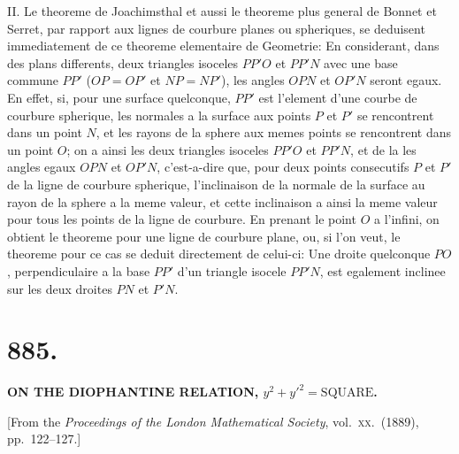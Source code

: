 \documentclass[11pt,a4paper]{book}
\begin{document}
\textsc{II.} Le theoreme de Joachimsthal et aussi le theoreme plus general de Bonnet et Serret, par rapport aux lignes de courbure planes ou spheriques, se deduisent immediatement de ce theoreme elementaire de Geometrie: En considerant, dans des plans differents, deux triangles isoceles $PP'O$ et $PP'N$ avec une base commune $PP'$ ($OP = OP'$ et $NP = NP'$), les angles $OPN$ et $OP'N$ seront egaux. En effet, si, pour une surface quelconque, $PP'$ est l'element d'une courbe de courbure spherique, les normales a la surface aux points $P$ et $P'$ se rencontrent dans un point $N$, et les rayons de la sphere aux memes points se rencontrent dans un point $O$; on a ainsi les deux triangles isoceles $PP'O$ et $PP'N$, et de la les angles egaux $OPN$ et $OP'N$, c'est-a-dire que, pour deux points consecutifs $P$ et $P'$ de la ligne de courbure spherique, l'inclinaison de la normale de la surface au rayon de la sphere a la meme valeur, et cette inclinaison a ainsi la meme valeur pour tous les points de la ligne de courbure. En prenant le point $O$ a l'infini, on obtient le theoreme pour une ligne de courbure plane, ou, si l'on veut, le theoreme pour ce cas se deduit directement de celui-ci: Une droite quelconque $PO$, perpendiculaire a la base $PP'$ d'un triangle isocele $PP'N$, est egalement inclinee sur les deux droites $PN$ et $P'N$.


\newpage
\section*{885.}

\begin{center}
\textbf{ON THE DIOPHANTINE RELATION, $y^2 + y'^2 = \text{SQUARE}$.}
\end{center}

\begin{center}
[From the \textit{Proceedings of the London Mathematical Society}, vol.\ \textsc{xx}.\ (1889), pp.\ 122--127.]
\end{center}
\end{document}
